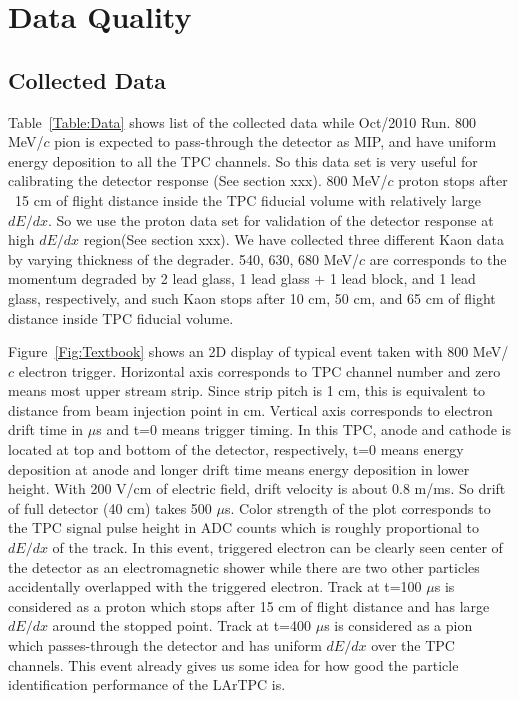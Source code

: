 
\section{Data Quality}
\subsection{Collected Data}

Table~\ref{Table:Data} shows list of the collected data while Oct/2010 Run.
800 MeV/$c$ pion is expected to pass-through the detector as MIP,
and have uniform energy deposition to all the TPC channels.
So this data set is very useful for calibrating the detector response (See section xxx).
800 MeV/$c$ proton stops after ~15 cm of flight distance inside the TPC fiducial volume
with relatively large $dE/dx$. So we use the proton data set for validation of the
detector response at high $dE/dx$ region(See section xxx).
We have collected three different Kaon data by varying thickness of the degrader. 
540, 630, 680 MeV/$c$ are corresponds to the momentum degraded by 
2 lead glass, 1 lead glass + 1 lead block, and 1 lead glass, respectively, 
and such Kaon stops after 10 cm, 50 cm, and 65 cm of flight distance inside TPC fiducial volume.

Figure~\ref{Fig:Textbook} shows an 2D display of typical event 
taken with 800 MeV/$c$ electron trigger.
Horizontal axis corresponds to TPC channel number 
and zero means most upper stream strip. 
Since strip pitch is 1 cm, this is equivalent to
distance from beam injection point in cm.
Vertical axis corresponds to electron drift time in $\mu$s
and t=0 means trigger timing. In this TPC, anode and cathode is
located at top and bottom of the detector, respectively,
t=0 means energy deposition at anode and longer drift time 
means energy deposition in lower height.
With 200 V/cm of electric field, drift velocity is about 0.8 m/ms.
So drift of full detector (40 cm) takes 500 $\mu$s.
Color strength of the plot corresponds to the TPC signal pulse height
in ADC counts which is roughly proportional to $dE/dx$ of the track.
In this event, triggered electron can be clearly seen center of the detector
as an electromagnetic shower while there are two other particles 
accidentally overlapped with the triggered electron. 
Track at t=100 $\mu$s is considered as
a proton which stops after 15 cm of flight distance and 
has large $dE/dx$ around the stopped point.
Track at t=400 $\mu$s is considered as
a pion which passes-through the detector and 
has uniform $dE/dx$ over the TPC channels.
This event already gives us some idea for how good 
the particle identification performance of the LArTPC is.

